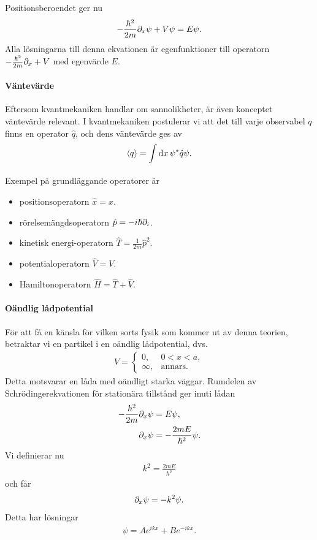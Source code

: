 Positionsberoendet ger nu
\begin{align*}
	-\frac{\hbar^{2}}{2m}\partial_{x}\psi + V\psi = E\psi.
\end{align*}
Alla lösningarna till denna ekvationen är egenfunktioner till operatorn $-\frac{\hbar^{2}}{2m}\partial_{x} + V$ med egenvärde $E$.

\paragraph{Väntevärde}
Eftersom kvantmekaniken handlar om sannolikheter, är även konceptet väntevärde relevant. I kvantmekaniken postulerar vi att det till varje observabel $q$ finns en operator $\hat{q}$, och dens väntevärde ges av
\begin{align*}
	\expval{q} = \int\limits_{}\dd{x}\psi^{*}\hat{q}\psi.
\end{align*}
Exempel på grundläggande operatorer är
\begin{itemize}
	\item positionsoperatorn $\hat{x} = x$.
	\item rörelsemängdsoperatorn $\hat{p} = -i\hbar\partial_{i}$.
	\item kinetisk energi-operatorn $\hat{T} = \frac{1}{2m}\hat{p}^{2}$.
	\item potentialoperatorn $\hat{V} = V$.
	\item Hamiltonoperatorn $\hat{H} = \hat{T} + \hat{V}$.
\end{itemize}

\paragraph{Oändlig lådpotential}
För att få en känsla för vilken sorts fysik som kommer ut av denna teorien, betraktar vi en partikel i en oändlig lådpotential, dvs.
\begin{align*}
	V = 
	\begin{cases}
		0,      &0 < x < a, \\
		\infty, &\text{annars.}
	\end{cases}
\end{align*}
Detta motsvarar en låda med oändligt starka väggar. Rumdelen av Schrödingerekvationen för stationära tillstånd ger inuti lådan
\begin{align*}
	-\frac{\hbar^{2}}{2m}\partial_{x}\psi &= E\psi, \\
	\partial_{x}\psi                      &= -\frac{2mE}{\hbar^{2}}\psi.
\end{align*}
Vi definierar nu
\begin{align*}
	k^{2} = \frac{2mE}{\hbar^{2}}
\end{align*}
och får
\begin{align*}
	\partial_{x}\psi = -k^{2}\psi.
\end{align*}
Detta har lösningar
\begin{align*}
	\psi = Ae^{ikx} + Be^{-ikx}.
\end{align*}

